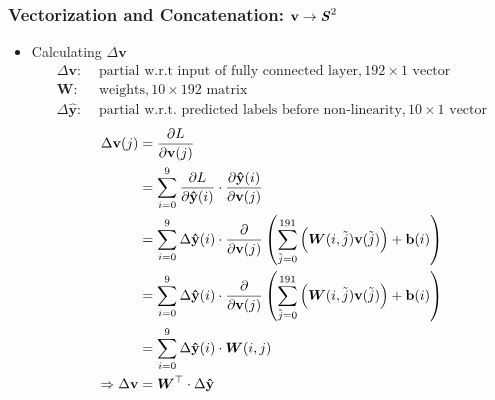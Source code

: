 \documentclass[12pt]{article}
\renewcommand{\vec}[1]{\mathbf{#1}}
\begin{document}
\subsubsection{Vectorization and Concatenation: $\vec{v} \rightarrow \textbf{\textit{S}}^2$}
\begin{itemize}
\item Calculating $\Delta \vec{v}$
\begin{align*}
    \Delta\vec{v}:& \text{ partial w.r.t input of fully connected layer}, 192 \times 1 \text{ vector}\\
    \bm{W}:& \text{ weights}, 10 \times 192 \text{ matrix}\\
    \Delta{\vec{\hat{y}}}:& \text{ partial w.r.t. predicted labels before non-linearity}, 10 \times 1 \text{ vector}
\end{align*}
\begin{align*}
    \Delta \vec{v}(j)
    &= \frac{\partial L}{\partial \vec{v}(j)}\\
    &= \sum_{i = 0}^{9}\frac{\partial{L}}{\partial{\vec{\hat{y}}(i)}}
    \cdot
    \frac{\partial{\vec{\hat{y}}(i)}}{\partial{\vec{v}(j)}}\\
    &= \sum_{i = 0}^{9}\Delta{\vec{\hat{y}}}(i)
    \cdot
    \frac{\partial}{\partial{\vec{v}(j)}}\left(\sum_{\Tilde{j} = 0}^{191}\Big(\bm{W}(i, \Tilde{j})\vec{v}(\Tilde{j})\Big) + \vec{b}(i)\right)\\
    &= \sum_{i = 0}^{9}\Delta{\vec{\hat{y}}}(i)
    \cdot
    \frac{\partial}{\partial{\vec{v}(j)}}\left(\sum_{\Tilde{j} = 0}^{191}\Big(\bm{W}(i, \Tilde{j})\vec{v}(\Tilde{j})\Big) + \vec{b}(i)\right)\\
    &= \sum_{i = 0}^{9}\Delta{\vec{\hat{y}}}(i)
    \cdot
    \bm{W}(i, j)\\
    \Rightarrow \Delta \vec{v} &= \bm{W}^\top \cdot \Delta \vec{\hat{y}}
\end{align*}
\end{itemize}
\end{document}
